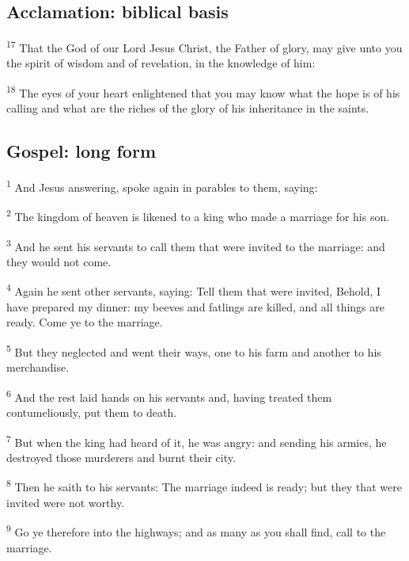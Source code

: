 \subsection{Acclamation: biblical basis}
\label{proper-acclamation}

\textsuperscript{17} That the God of our Lord Jesus Christ, the Father of glory, may give unto you the spirit of wisdom and of revelation, in the knowledge of him:

\textsuperscript{18} The eyes of your heart enlightened that you may know what the hope is of his calling and what are the riches of the glory of his inheritance in the saints.

\subsection{Gospel: long form}
\label{proper-gospel-long}

\textsuperscript{1} And Jesus answering, spoke again in parables to them, saying:

\textsuperscript{2} The kingdom of heaven is likened to a king who made a marriage for his son.

\textsuperscript{3} And he sent his servants to call them that were invited to the marriage: and they would not come.

\textsuperscript{4} Again he sent other servants, saying: Tell them that were invited, Behold, I have prepared my dinner: my beeves and fatlings are killed, and all things are ready. Come ye to the marriage.

\textsuperscript{5} But they neglected and went their ways, one to his farm and another to his merchandise.

\textsuperscript{6} And the rest laid hands on his servants and, having treated them contumeliously, put them to death.

\textsuperscript{7} But when the king had heard of it, he was angry: and sending his armies, he destroyed those murderers and burnt their city.

\textsuperscript{8} Then he saith to his servants: The marriage indeed is ready; but they that were invited were not worthy.

\textsuperscript{9} Go ye therefore into the highways; and as many as you shall find, call to the marriage.

